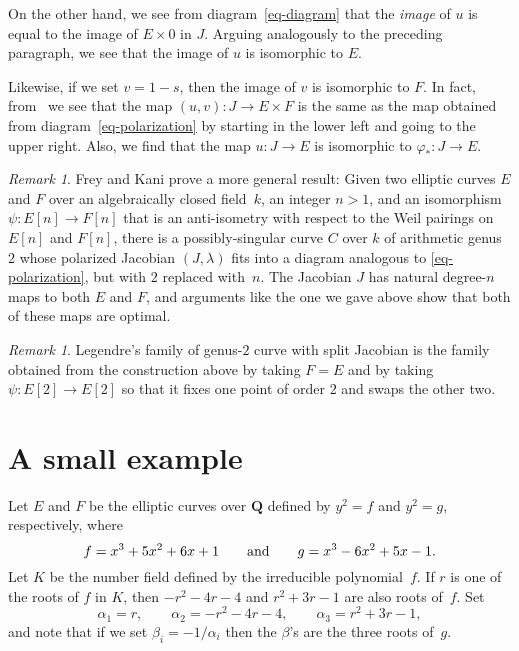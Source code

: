 \documentclass{amsart}
\theoremstyle{remark}
\newtheorem{remark}[theorem]{Remark}
\begin{document}
On the other hand, we see from diagram~\eqref{eq-diagram} that the \emph{image}
of $u$ is equal to the image of $E\times 0$ in $J$.  Arguing analogously to the
preceding paragraph, we see that the image of $u$ is isomorphic to $E$.

Likewise, if we set $v = 1 - s$, then the image of $v$ is isomorphic to $F$.
In fact, from~\cite[\S{}1]{FreyKani1991} we see that the map 
$(u,v)\colon J\to E \times F$ is the same as the map obtained from 
diagram~\eqref{eq-polarization} by starting in the lower left and going to the
upper right. Also, we find that the map $u\colon J\to E$ is isomorphic to 
$\varphi_*\colon J\to E$.   

\begin{remark}
Frey and Kani prove a more general result: Given two elliptic curves $E$ and
$F$ over an algebraically closed field~$k$, an integer $n>1$, and an 
isomorphism $\psi\colon E[n]\to F[n]$ that is an anti-isometry with respect to 
the Weil pairings on $E[n]$ and $F[n]$, there is a possibly-singular curve $C$
over $k$ of arithmetic genus $2$ whose polarized Jacobian $(J,\lambda)$ fits 
into a diagram analogous to \eqref{eq-polarization}, but with $2$ replaced 
with~$n$. The Jacobian $J$ has natural degree-$n$ maps to both $E$ and $F$, and
arguments like the one we gave above show that both of these maps are optimal.
\end{remark}

\begin{remark}
\label{R:Legendre}
Legendre's family of genus-$2$ curve with split Jacobian
\cite[Troisi\`eme Suppl\'ement, \S{}XII, pp.~333--359]{Legendre1828} is the 
family obtained from the construction above by taking $F = E$ and by taking 
$\psi\colon E[2]\to E[2]$ so that it fixes one point of order $2$ and swaps 
the other two.
\end{remark}

\section{A small example}
\label{S:example}

Let $E$ and $F$ be the elliptic curves over ${{\mathbf{Q}}}$ defined by $y^2 = f$ and 
$y^2 = g$, respectively, where
\[
f = x^3 + 5 x^2 + 6 x + 1 
\text{\qquad and\qquad}
g = x^3 - 6 x^2 + 5 x - 1.
\]
Let $K$ be the number field defined by the irreducible polynomial~$f$. If $r$
is one of the roots of $f$ in $K$, then $-r^2 - 4 r - 4$ and $r^2 + 3 r - 1$ 
are also roots of~$f$. Set 
\[
\alpha_1 = r, \qquad 
\alpha_2 = -r^2 - 4 r - 4, \qquad 
\alpha_3 = r^2 + 3 r - 1,
\]
and note that if we set $\beta_i = -1/\alpha_i$ then the $\beta$'s are the 
three roots of~$g$.
\end{document}
